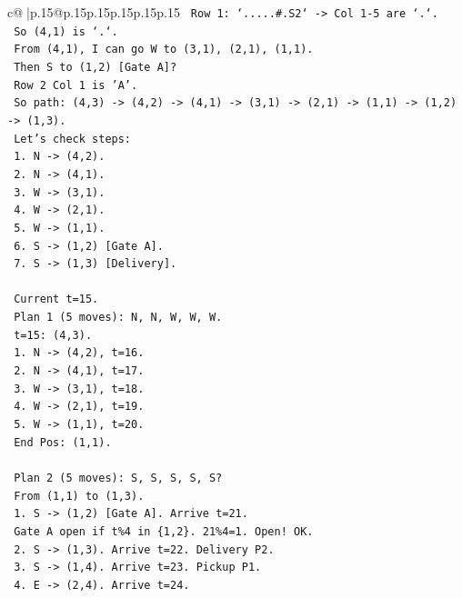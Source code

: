 \documentclass{article}
\begin{document}
{\begin{supertabular}{c@{$\;$}|p{.15\linewidth}@{}p{.15\linewidth}p{.15\linewidth}p{.15\linewidth}p{.15\linewidth}p{.15\linewidth}}
{{{\texttt{   Row 1: `.....\#.S2` {-}> Col 1{-}5 are `.`.} \\
\texttt{   So (4,1) is `.`.} \\
\texttt{   From (4,1), I can go W to (3,1), (2,1), (1,1).} \\
\texttt{   Then S to (1,2) {[}Gate A{]}?} \\
\texttt{   Row 2 Col 1 is 'A'.} \\
\texttt{   So path: (4,3) {-}> (4,2) {-}> (4,1) {-}> (3,1) {-}> (2,1) {-}> (1,1) {-}> (1,2) {-}> (1,3).} \\
\texttt{   Let's check steps:} \\
\texttt{   1. N {-}> (4,2).} \\
\texttt{   2. N {-}> (4,1).} \\
\texttt{   3. W {-}> (3,1).} \\
\texttt{   4. W {-}> (2,1).} \\
\texttt{   5. W {-}> (1,1).} \\
\texttt{   6. S {-}> (1,2) {[}Gate A{]}.} \\
\texttt{   7. S {-}> (1,3) {[}Delivery{]}.} \\
\\ 
\texttt{   Current t=15.} \\
\texttt{   Plan 1 (5 moves): N, N, W, W, W.} \\
\texttt{   t=15: (4,3).} \\
\texttt{   1. N {-}> (4,2), t=16.} \\
\texttt{   2. N {-}> (4,1), t=17.} \\
\texttt{   3. W {-}> (3,1), t=18.} \\
\texttt{   4. W {-}> (2,1), t=19.} \\
\texttt{   5. W {-}> (1,1), t=20.} \\
\texttt{   End Pos: (1,1).} \\
\\ 
\texttt{   Plan 2 (5 moves): S, S, S, S, S?} \\
\texttt{   From (1,1) to (1,3).} \\
\texttt{   1. S {-}> (1,2) {[}Gate A{]}. Arrive t=21.} \\
\texttt{      Gate A open if t\%4 in \{1,2\}. 21\%4=1. Open! OK.} \\
\texttt{   2. S {-}> (1,3). Arrive t=22. Delivery P2.} \\
\texttt{   3. S {-}> (1,4). Arrive t=23. Pickup P1.} \\
\texttt{   4. E {-}> (2,4). Arrive t=24.} \\
}}}
\end{supertabular}}
\end{document}
